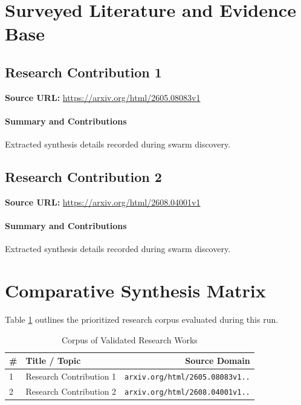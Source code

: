 \documentclass[conference]{IEEEtran}
\begin{document}
\section{Surveyed Literature and Evidence Base}
\subsection{Research Contribution 1}
\label{sec:paper_1}
\textbf{Source URL:} \url{https://arxiv.org/html/2605.08083v1} \cite{ref_1}\\

\paragraph{Summary and Contributions} Extracted synthesis details recorded during swarm discovery.

\subsection{Research Contribution 2}
\label{sec:paper_2}
\textbf{Source URL:} \url{https://arxiv.org/html/2608.04001v1} \cite{ref_2}\\

\paragraph{Summary and Contributions} Extracted synthesis details recorded during swarm discovery.

\section{Comparative Synthesis Matrix}
Table \ref{tab:comparison} outlines the prioritized research corpus evaluated during this run.
\begin{table}[h!]
\centering
\small
\begin{tabular}{llr}
\toprule
\textbf{\#} & \textbf{Title / Topic} & \textbf{Source Domain} \\
\midrule
1 & Research Contribution 1 & \texttt{arxiv.org/html/2605.08083v1..} \\
2 & Research Contribution 2 & \texttt{arxiv.org/html/2608.04001v1..} \\
\bottomrule
\end{tabular}
\caption{Corpus of Validated Research Works}
\label{tab:comparison}
\end{table}
\end{document}
